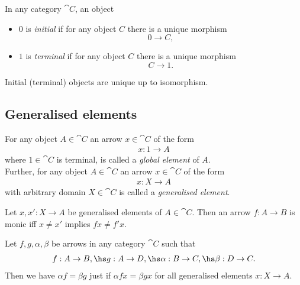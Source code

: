 \documentclass{article}
\begin{document}
\begin{definition}[Awodey 2.9]
    In any category $\cat C$, an object
    \begin{itemize}
        \item $0$ is \emph{initial} if for any object $C$ there is a unique morphism
              \[0\to C,\]
        \item $1$ is \emph{terminal} if for any object $C$ there is a unique morphism
              \[C\to 1.\]
    \end{itemize}
\end{definition}

\begin{proposition}[Awodey 2.10]
    Initial (terminal) objects are unique up to isomorphism.
\end{proposition}

\subsection{Generalised elements}

\begin{definition}
    For any object $A\in\cat C$ an arrow $x\in\cat C$ of the form
    \begin{align*}
        x: 1 \to A
    \end{align*}
    where $1\in\cat C$ is terminal, is called a \emph{global element}
    of $A$.\\
    Further, for any object $A\in\cat C$ an arrow $x\in\cat C$ of the
    form
    \begin{align*}
        x: X\to A
    \end{align*}
    with arbitrary domain $X\in\cat C$ is called a \emph{generalised element}.
\end{definition}

\begin{lemma}
    Let $x,x': X\to A$ be generalised elements of $A\in\cat C$. Then an arrow
    $f:A\to B$ is monic iff $x\not=x'$ implies $fx\not=f'x$.
\end{lemma}

\begin{lemma}
    Let $f,g,\alpha,\beta$ be arrows in any category $\cat C$ such that
    \begin{align*}
        f:A\to B,\hs g:A\to D,\hs \alpha:B\to C,\hs \beta:D\to C.
    \end{align*}
    Then we have $\alpha f=\beta g$ just if $\alpha f x = \beta g x$ for all generalised
    elements $x:X\to A$.
\end{lemma}
\end{document}
